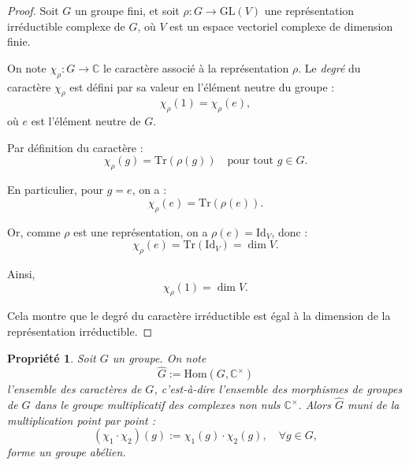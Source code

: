 \documentclass[12pt]{article}
\newtheorem{propriete}{Propriété}
\begin{document}
	\begin{proof}
		Soit \( G \) un groupe fini, et soit \( \rho : G \to \mathrm{GL}(V) \) une représentation irréductible complexe de \( G \), où \( V \) est un espace vectoriel complexe de dimension finie.
		
		On note \( \chi_\rho : G \to \mathbb{C} \) le caractère associé à la représentation \( \rho \). Le \emph{degré} du caractère \( \chi_\rho \) est défini par sa valeur en l’élément neutre du groupe :
		\[
		\chi_\rho(1) = \chi_\rho(e),
		\]
		où \( e \) est l’élément neutre de \( G \).
		
		Par définition du caractère :
		\[
		\chi_\rho(g) = \mathrm{Tr}(\rho(g)) \quad \text{pour tout } g \in G.
		\]
		
		En particulier, pour \( g = e \), on a :
		\[
		\chi_\rho(e) = \mathrm{Tr}(\rho(e)).
		\]
		
		Or, comme \( \rho \) est une représentation, on a \( \rho(e) = \mathrm{Id}_V \), donc :
		\[
		\chi_\rho(e) = \mathrm{Tr}(\mathrm{Id}_V) = \dim V.
		\]
		
		Ainsi,
		\[
		\chi_\rho(1) = \dim V.
		\]
		
		Cela montre que le degré du caractère irréductible est égal à la dimension de la représentation irréductible.
		
	\end{proof}
	
	
	\newpage
	
	\begin{propriete}
		Soit \( G \) un groupe. On note
		\[
		\widehat{G} := \mathrm{Hom}(G, \mathbb{C}^\times)
		\]
		l’ensemble des caractères de \( G \), c’est-à-dire l’ensemble des morphismes de groupes de \( G \) dans le groupe multiplicatif des complexes non nuls \( \mathbb{C}^\times \). Alors \( \widehat{G} \) muni de la multiplication point par point :
		\[
		(\chi_1 \cdot \chi_2)(g) := \chi_1(g) \cdot \chi_2(g), \quad \forall g \in G,
		\]
		forme un groupe abélien.
	\end{propriete}
	
\end{document}
